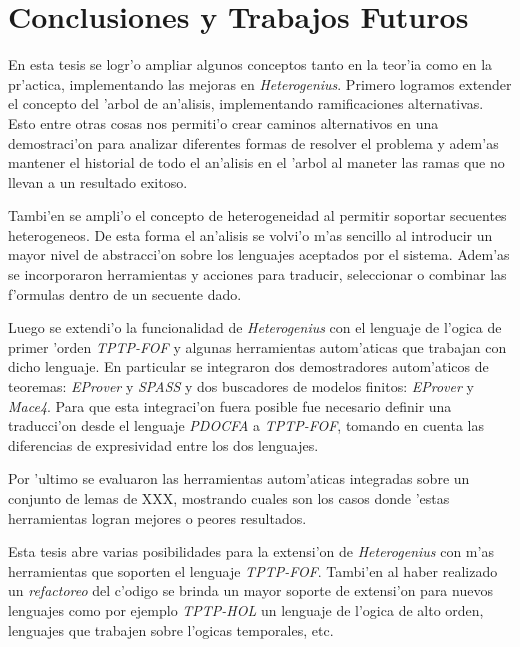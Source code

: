 \chapter{Conclusiones y Trabajos Futuros}

En esta tesis se logr'o ampliar algunos conceptos tanto en la teor'ia como en la pr'actica, implementando las mejoras en \textit{Heterogenius}. Primero logramos extender el concepto del 'arbol de an'alisis, implementando ramificaciones alternativas. Esto entre otras cosas nos permiti'o crear caminos alternativos en una demostraci'on para analizar diferentes formas de resolver el problema y adem'as mantener el historial de todo el an'alisis en el 'arbol al maneter las ramas que no llevan a un resultado exitoso.

Tambi'en se ampli'o el concepto de heterogeneidad al permitir soportar secuentes heterogeneos. De esta forma el an'alisis se volvi'o m'as sencillo al introducir un mayor nivel de abstracci'on sobre los lenguajes aceptados por el sistema. Adem'as se incorporaron herramientas y acciones para traducir, seleccionar o combinar  las f'ormulas dentro de un secuente dado.

Luego se extendi'o la funcionalidad de \textit{Heterogenius} con el lenguaje de l'ogica de primer 'orden \textit{TPTP-FOF} y algunas herramientas autom'aticas que trabajan con dicho lenguaje. En particular se integraron dos demostradores autom'aticos de teoremas: \textit{EProver} y \textit{SPASS} y dos buscadores de modelos finitos: \textit{EProver} y \textit{Mace4}. Para que esta integraci'on fuera posible fue necesario definir una traducci'on desde el lenguaje \textit{PDOCFA} a \textit{TPTP-FOF}, tomando en cuenta las diferencias de expresividad entre los dos lenguajes.

Por 'ultimo se evaluaron las herramientas autom'aticas integradas sobre un conjunto de lemas de XXX, mostrando cuales son los casos donde 'estas herramientas logran mejores o peores resultados.

Esta tesis abre varias posibilidades para la extensi'on de \textit{Heterogenius} con m'as herramientas que soporten el lenguaje \textit{TPTP-FOF}. Tambi'en al haber realizado un \textit{refactoreo} del c'odigo se brinda un mayor soporte de extensi'on para nuevos lenguajes como por ejemplo \textit{TPTP-HOL} un lenguaje de l'ogica de alto orden, lenguajes que trabajen sobre l'ogicas temporales, etc.

